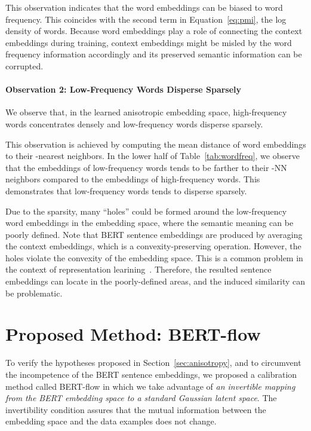 \documentclass[11pt,a4paper]{article}
\begin{document}
This observation indicates that the word embeddings can be biased to word frequency. This coincides with the second term in Equation~\ref{eq:pmi}, the log density of words. 
Because word embeddings play a role of connecting the context embeddings during training, context embeddings might be misled by the word frequency information accordingly and its preserved semantic information can be corrupted.


\paragraph{Observation 2: Low-Frequency Words Disperse Sparsely} 
\label{sec:h2}
We observe that, in the learned anisotropic embedding space, high-frequency words concentrates densely and low-frequency words disperse sparsely. 

This observation is achieved by computing the mean  distance of word embeddings to their -nearest neighbors. In the lower half of Table~\ref{tab:wordfreq}, we observe that the embeddings of low-frequency words tends to be farther to their -NN neighbors compared to the embeddings of high-frequency words. This demonstrates that low-frequency words tends to disperse sparsely. 

Due to the sparsity, many ``holes'' could be formed around the low-frequency word embeddings in the embedding space, where the semantic meaning can be poorly defined. Note that BERT sentence embeddings are produced by averaging the context embeddings, which is a convexity-preserving operation. However, the holes violate the convexity of the embedding space. This is a common problem in the context of representation learining~\citep{rezende2018taming,li2019surprisingly,ghosh2019variational}. Therefore, the resulted sentence embeddings can locate in the poorly-defined areas, and the induced  similarity can be problematic.








 

\section{Proposed Method: BERT-flow}
To verify the hypotheses proposed in Section~\ref{sec:anisotropy}, and to circumvent the incompetence of the BERT sentence embeddings, we proposed a calibration method called BERT-flow in which we take advantage of \textit{an invertible mapping from the BERT embedding space to a standard Gaussian latent space}. The invertibility condition assures that the mutual information between the embedding space and the data examples does not change. 
\end{document}
